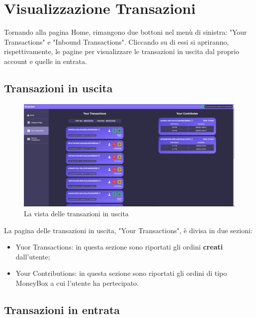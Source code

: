 \section{Visualizzazione Transazioni}

Tornando alla pagina Home, rimangono due bottoni nel menù di sinistra: "Your Transactions" e "Inbound Transactions".
Cliccando su di essi si apriranno, rispettivamente, le pagine per visualizzare le transazioni in uscita dal proprio account e quelle in entrata.


\subsection{Transazioni in uscita}

\begin{figure}[H]
    \centering
    \includegraphics[scale=0.4]{immagini/transactionview.jpg}
    \caption{La vista delle transazioni in uscita}
\end{figure}

La pagina delle transazioni in uscita, "Your Transactions", è divisa in due sezioni:
\begin{itemize}
    \item Yuor Transactions: in questa sezione sono riportati gli ordini \textbf{creati} dall'utente;
    \item Your Contributions: in questa sezione sono riportati gli ordini di tipo MoneyBox a cui l'utente ha pertecipato.
\end{itemize}

\subsection{Transazioni in entrata}

